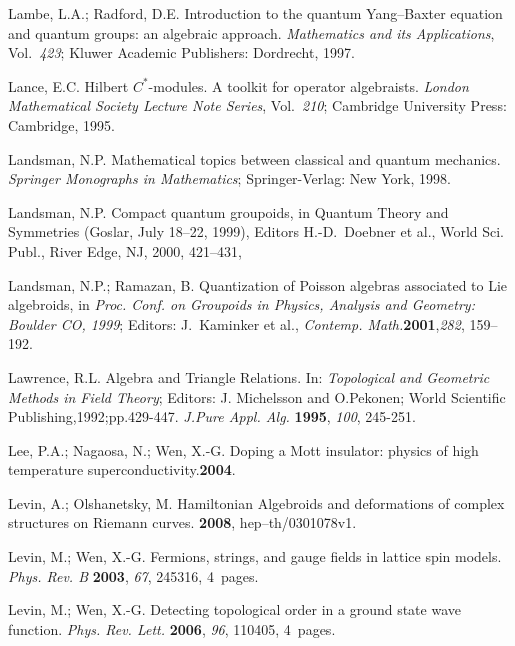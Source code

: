\documentclass[12pt]{article}
\theoremstyle{plain}
\theoremstyle{definition}
\numberwithin{equation}{section}
\begin{document}
\begin{thebibliography}{99}
Lambe, L.A.; Radford, D.E.  Introduction to the quantum Yang--Baxter equation and quantum groups: an algebraic approach. \emph{Mathematics and its Applications}, Vol.~{\em 423}; Kluwer Academic Publishers: Dordrecht, 1997.

Lance, E.C.  Hilbert $C^*$-modules. A toolkit for operator algebraists.  {\em London Mathematical Society Lecture Note Series}, Vol.~{\em 210}; Cambridge University Press: Cambridge, 1995.

Landsman, N.P.  Mathematical topics between classical and quantum mechanics. {\em Springer Monographs in Mathematics}; Springer-Verlag: New York, 1998.

Landsman, N.P.  Compact quantum groupoids, in  Quantum Theory and Symmetries (Goslar,  July 18--22, 1999), Editors H.-D.~Doebner et al., World Sci. Publ., River Edge, NJ, 2000, 421--431, 

Landsman, N.P.; Ramazan, B. Quantization of Poisson algebras associated to Lie algebroids, in {\em Proc. Conf. on Groupoids in Physics, Analysis and Geometry: Boulder CO, 1999}; Editors: J.~Kaminker et al., \emph{Contemp. Math.}{\bf 2001},{\em 282}, 159--192.  

Lawrence, R.L. Algebra and Triangle Relations. In: {\em Topological and Geometric Methods in Field Theory}; Editors: J. Michelsson and O.Pekonen; World Scientific Publishing,1992;pp.429-447. {\em J.Pure Appl. Alg.} {\bf 1995}, {\em 100}, 245-251.

Lee, P.A.; Nagaosa, N.; Wen, X.-G.  Doping a Mott insulator: physics of high temperature superconductivity.{\bf 2004}. 

Levin, A.; Olshanetsky, M.  Hamiltonian Algebroids and deformations of complex structures on Riemann curves. {\bf 2008}, hep--th/0301078v1.

Levin, M.; Wen, X.-G.  Fermions, strings, and gauge fields in lattice spin models.  {\em Phys. Rev. B} {\bf 2003}, {\em 67}, 245316, 4~pages. %

Levin, M.; Wen, X.-G.  Detecting topological order in a ground state wave function. {\em Phys. Rev. Lett.} {\bf 2006}, {\em 96}, 110405, 4~pages. %


\end{thebibliography}
\end{document}
